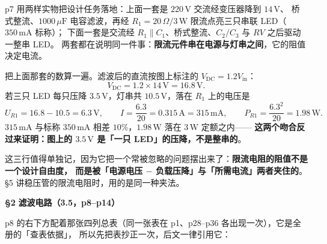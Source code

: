 \documentclass[11pt]{ctexart}
\renewcommand{\hdr}[2]{%
  \par\vspace{12pt}%
  \noindent\colorbox{violetdeep}{\color{white}\bfseries\small\;#1\;}\hspace{7pt}%
  {\color{violetdeep}\large\bfseries #2}\par\nobreak
  \vspace{3pt}{\color{petal}\hrule height 1.2pt}\nopagebreak[4]\vspace{6pt}}
\renewcommand{\subhdr}[1]{%
  \par\vspace{6pt}%
  \noindent{\color{violet}\bfseries #1}\par\nopagebreak[4]\vspace{1pt}}
\begin{document}
p7 用两样实物把设计任务落地：上面一套是 $220\,\mathrm{V}$ 交流经变压器降到 $14\,\mathrm{V}$、
桥式整流、$1000\,\mu\mathrm{F}$ 电容滤波，再经 $R_1=20\,\Omega/3\,\mathrm{W}$ 限流点亮三只串联 LED（$350\,\mathrm{mA}$ 标称）；
下面一套是交流经 $R_1\parallel C_1$、桥式整流、$C_2/C_3$ 与 $RV$ 之后驱动一整串 LED。
两套都在说明同一件事：\textbf{限流元件串在电源与灯串之间}，它的阻值决定电流。

把上面那套的数算一遍。滤波后的直流按图上标注的 \emph{$V_{\mathrm{DC}}=1.2V_{\mathrm{in}}$}：
\[
V_{\mathrm{DC}}=1.2\times14\,\mathrm{V}=16.8\,\mathrm{V}.
\]
若三只 LED 每只压降 $3.5\,\mathrm{V}$，灯串共 $10.5\,\mathrm{V}$，落在 $R_1$ 上的电压是
\[
U_{R1}=16.8-10.5=6.3\,\mathrm{V},
\qquad
I=\frac{6.3}{20}=0.315\,\mathrm{A}=315\,\mathrm{mA},
\qquad
P_{R1}=\frac{6.3^2}{20}=1.98\,\mathrm{W}.
\]
$315\,\mathrm{mA}$ 与标称 $350\,\mathrm{mA}$ 相差 $10\%$，$1.98\,\mathrm{W}$ 落在 $3\,\mathrm{W}$ 定额之内——
\textbf{这两个吻合反过来证明：图上的 $3.5\,\mathrm{V}$ 是「一只 LED」的压降，不是整串的}。


这三行值得单独记，因为它把一个常被忽略的问题摆出来了：\textbf{限流电阻的阻值不是一个设计自由度，
而是被「电源电压 $-$ 负载压降」与「所需电流」两者夹住的}。§5 讲稳压管的限流电阻时，用的是同一种夹法。

\hdr{§2}{滤波电路（3.5，p8--p14）}

\subhdr{2.1 E1 四问：题面与答案总表}


p8 的右下方配着那张四列总表（同一张表在 p1、p28--p36 各出现一次），它是全册的「查表依据」，
所以先把表抄正一次，后文一律引用它：
\end{document}
